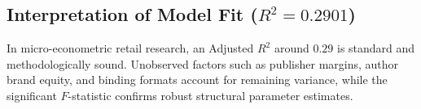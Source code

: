 \documentclass[11pt,a4paper]{article}
\begin{document}
\subsection{Interpretation of Model Fit ($R^2 = 0.2901$)}
In micro-econometric retail research, an Adjusted $R^2$ around $0.29$ is standard and methodologically sound. Unobserved factors such as publisher margins, author brand equity, and binding formats account for remaining variance, while the significant $F$-statistic confirms robust structural parameter estimates.

\end{document}
